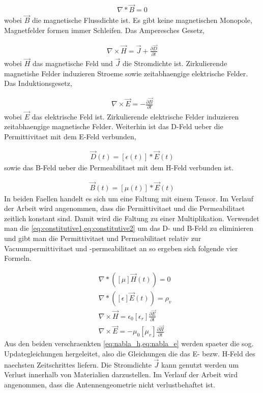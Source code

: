 \documentclass[11pt, ngerman]{article}
\begin{document}
\begin{align}
	\nabla * \vec{B} = 0
	\label{eq:gausz_law_h}
\end{align}
wobei \(\vec{B}\) die magnetische Flussdichte ist.
Es gibt keine magnetischen Monopole, Magnetfelder formen immer Schleifen.
Das Amperesches Gesetz\cite{amperes_law},

\begin{align}
	\nabla\times\vec{H} = \vec{J} + \frac{\partial\vec{D}}{\partial t}
\end{align}
wobei \(\vec{H}\) das magnetische Feld und \(\vec{J}\) die Stromdichte ist.
Zirkulierende magnetishe Felder induzieren Stroeme sowie zeitabhaengige
elektrische Felder. Das Induktionsgesetz\cite{induction_law},

\begin{align}
	\nabla\times\vec{E} = -\frac{\partial\vec{B}}{\partial t}
\end{align}
wobei \(\vec{E}\) das elektrische Feld ist.
Zirkulierende elektrische Felder induzieren zeitabhaengige magnetische Felder.
Weiterhin ist das D-Feld ueber die Permittivitaet mit dem E-Feld verbunden,\cite{constitutive}

\begin{align}
	\vec{D}(t) = [\epsilon(t)] * \vec{E}(t)
	\label{eq:constitutive1}
\end{align}
sowie das B-Feld ueber die Permeabilitaet mit dem H-Feld verbunden ist.\cite{constitutive}

\begin{align}
	\vec{B}(t) = [\mu(t)] * \vec{E}(t)
	\label{eq:constitutive2}
\end{align}
In beiden Faellen handelt es sich um eine Faltung mit einem Tensor.
Im Verlauf der Arbeit wird angenommen, dass die Permittivitaet und die Permeabilitaet zeitlich
konstant sind. Damit wird die Faltung zu einer Multiplikation. Verwendet man die
\cref{eq:constitutive1,eq:constitutive2} um das D- und B-Feld zu eliminieren und
gibt man die Permittivitaet und Permeabilitaet relativ zur Vacuumpermittivitaet und
-permeabilitaet an so ergeben sich folgende vier Formeln.

\begin{align}
	&\nabla * ([\mu]\vec{H}(t)) = 0 \\
	&\nabla * ([\epsilon]\vec{E}(t)) = \rho_v \\
	&\nabla\times\vec{H} = \epsilon_0[\epsilon_r]\frac{\partial\vec{E}}{\partial t} \label{eq:nabla_h} \\
	&\nabla\times\vec{E} = -\mu_0[\mu_r]\frac{\partial\vec{H}}{\partial t} \label{eq:nabla_e}
\end{align}
Aus den beiden verschraenkten \cref{eq:nabla_h,eq:nabla_e} werden spaeter die sog.
Updategleichungen hergeleitet, also die Gleichungen die das E- bezw. H-Feld des naechsten
Zeitschrittes liefern. Die Stromdichte \(\vec{J}\) kann genutzt werden um
Verlust innerhalb von Materialien darzustellen. Im Verlauf der Arbeit wird angenommen,
dass die Antennengeometrie nicht verlustbehaftet ist.
\end{document}
